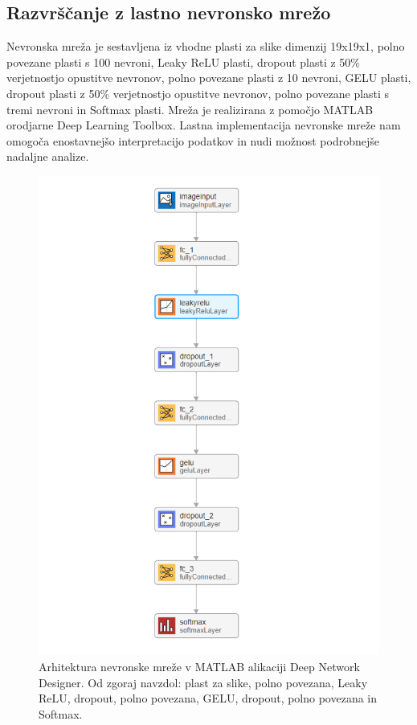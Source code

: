 \subsection{Razvrščanje z lastno nevronsko mrežo}
Nevronska mreža je sestavljena iz vhodne plasti za slike dimenzij 19x19x1, polno povezane plasti s 100 nevroni, Leaky ReLU plasti, dropout plasti z 50\% verjetnostjo opustitve nevronov, polno povezane plasti z 10 nevroni, GELU plasti, dropout plasti z 50\% verjetnostjo opustitve nevronov, polno povezane plasti s tremi nevroni in Softmax plasti. Mreža je realizirana z pomočjo MATLAB orodjarne Deep Learning Toolbox. Lastna implementacija nevronske mreže nam omogoča enostavnejšo interpretacijo podatkov in nudi možnost podrobnejše nadaljne analize.
\begin{figure}[h!]
\begin{center}
\includegraphics[width=0.8\linewidth]{slike/Neural network.png}
\end{center}
\caption{Arhitektura nevronske mreže v MATLAB alikaciji Deep Network Designer. Od zgoraj navzdol: plast za slike, polno povezana, Leaky ReLU, dropout, polno povezana, GELU, dropout, polno povezana in Softmax.}
\end{figure}






